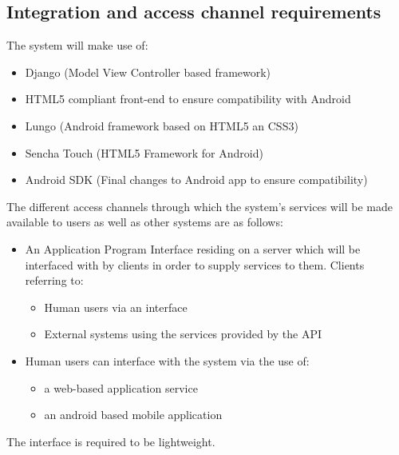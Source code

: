 \documentclass{article}
\begin{document}
		\cleardoublepage
		
	\subsection{Integration and access channel requirements}\label{subsec:integration}
		The system will make use of:
			\begin{itemize}
				\item Django (Model View Controller based framework)
				\item HTML5 compliant front-end to ensure compatibility with Android
				\item Lungo (Android framework based on HTML5 an CSS3)
				\item Sencha Touch (HTML5 Framework for Android)
				\item Android SDK (Final changes to Android app to ensure compatibility)
			\end{itemize}
			
			The different access channels through which the system's services will be made available to users as well as other systems are as follows:
			\begin{itemize}
				\item An Application Program Interface residing on a server which will be interfaced with by clients in order to supply services to them. Clients referring to:
				\begin{itemize}
					\item Human users via an interface
					\item External systems using the services provided by the API
				\end{itemize}
				\item Human users can interface with the system via the use of:
				\begin{itemize}
					\item a web-based application service
					\item an android based mobile application
				\end{itemize}
			\end{itemize}
			The interface is required to be lightweight.

			\cleardoublepage
			
\end{document}
